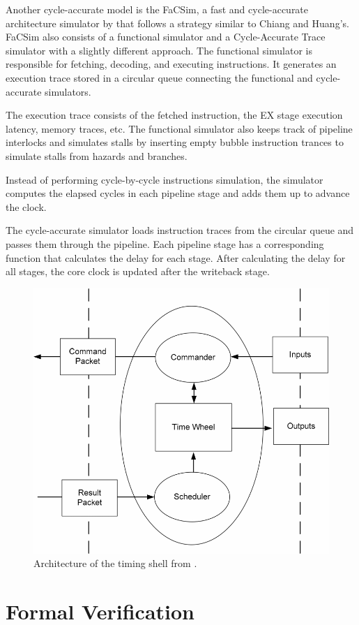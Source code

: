 Another cycle-accurate model is the FaCSim, a fast and cycle-accurate architecture simulator by \textcite{leeFaCSimFastCycleAccurate2008} that follows a strategy similar to Chiang and Huang's. FaCSim also consists of a functional simulator and a Cycle-Accurate Trace simulator with a slightly different approach. The functional simulator is responsible for fetching, decoding, and executing instructions. It generates an execution trace stored in a circular queue connecting the functional and cycle-accurate simulators. 

The execution trace consists of the fetched instruction, the EX stage execution latency, memory traces, etc. The functional simulator also keeps track of pipeline interlocks and simulates stalls by inserting empty bubble instruction trances to simulate stalls from hazards and branches.

Instead of performing cycle-by-cycle instructions simulation, the simulator computes the elapsed cycles in each pipeline stage and adds them up to advance the clock. 

The cycle-accurate simulator loads instruction traces from the circular queue and passes them through the pipeline. Each pipeline stage has a corresponding function that calculates the delay for each stage. After calculating the delay for all stages, the core clock is updated after the writeback stage. 

\begin{figure}[htb]
    \centering
    \includegraphics[width=0.5\linewidth]{figures/timeShell.png}
    \caption{Architecture of the timing shell from \cite{chiangEfficientTwolayeredCycleaccurate2009}.}
    \label{fig:timeshell}
\end{figure}

\section{Formal Verification}
\label{sec:bg_formal}

